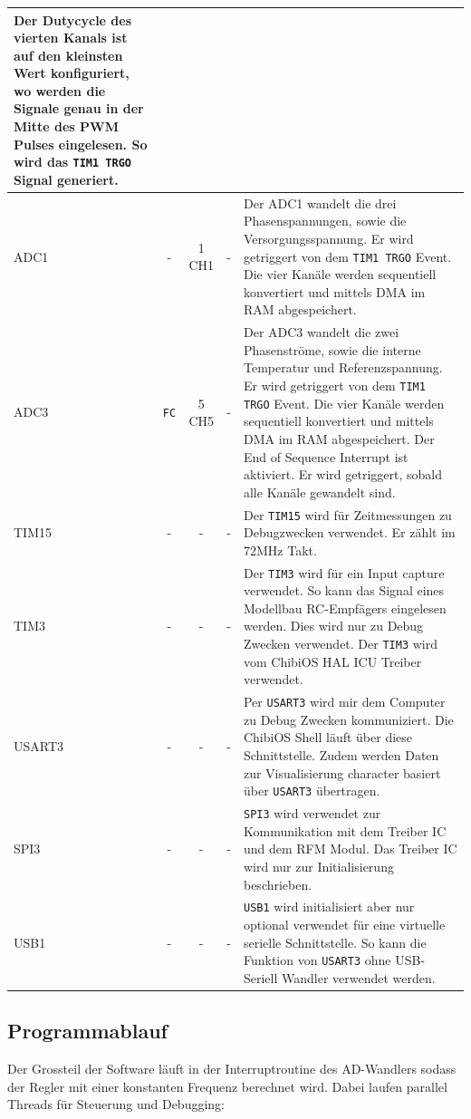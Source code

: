 \begin{tabularx}{\textwidth}{l|c|c|c|X}
	Der Dutycycle des vierten Kanals ist auf den kleinsten Wert konfiguriert, wo werden die Signale genau in der Mitte des PWM Pulses eingelesen. So wird das \texttt{TIM1 TRGO} Signal generiert.
	\\ \hline
	ADC1 &
	- &
	1 CH1 &
	- &
	Der ADC1 wandelt die drei Phasenspannungen, sowie die Versorgungsspannung. Er wird getriggert von dem \texttt{TIM1 TRGO} Event. Die vier Kanäle werden sequentiell konvertiert und mittels DMA im RAM abgespeichert.
	\\ \hline
	ADC3 &
	\texttt{FC} &
	5 CH5 &
	- &
	Der ADC3 wandelt die zwei Phasenströme, sowie die interne Temperatur und Referenzspannung. Er wird getriggert von dem \texttt{TIM1 TRGO} Event. Die vier Kanäle werden sequentiell konvertiert und mittels DMA im RAM abgespeichert. Der End of Sequence Interrupt ist aktiviert. Er wird getriggert, sobald alle Kanäle gewandelt sind.
	\\ \hline
	TIM15 &
	- &
	- &
	- &
	Der \texttt{TIM15} wird für Zeitmessungen zu Debugzwecken verwendet. Er zählt im 72MHz Takt.
	\\ \hline
	TIM3 &
	- &
	- &
	- &
	Der \texttt{TIM3} wird für ein Input capture verwendet. So kann das Signal eines Modellbau RC-Empfägers eingelesen werden. Dies wird nur zu Debug Zwecken verwendet. Der \texttt{TIM3} wird vom ChibiOS HAL ICU Treiber verwendet.
	\\ \hline
	USART3 &
	- &
	- &
	- &
	Per \texttt{USART3} wird mir dem Computer zu Debug Zwecken kommuniziert. Die ChibiOS Shell läuft über diese Schnittstelle. Zudem werden Daten zur Visualisierung character basiert über \texttt{USART3} übertragen.
	\\ \hline
	SPI3 &
	- &
	- &
	- &
	\texttt{SPI3} wird verwendet zur Kommunikation mit dem Treiber IC und dem RFM Modul. Das Treiber IC wird nur zur Initialisierung beschrieben.
	\\ \hline
	USB1 &
	- &
	- &
	- &
	\texttt{USB1} wird initialisiert aber nur optional verwendet für eine virtuelle serielle Schnittstelle. So kann die Funktion von \texttt{USART3} ohne USB-Seriell Wandler verwendet werden.
\end{tabularx}
\label{tab:periph}


\subsection*{Programmablauf}
Der Grossteil der Software läuft in der Interruptroutine des AD-Wandlers sodass der Regler mit einer konstanten Frequenz berechnet wird. Dabei laufen parallel Threads für Steuerung und Debugging:\\

